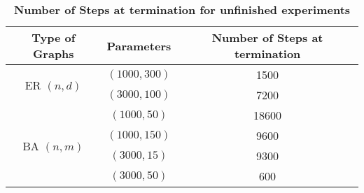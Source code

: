 \begin{table*}[!htpb]
\centering
\small
\caption{\textbf{Number of Steps at termination for unfinished \lwd experiments}}
\label{tab:lwd-steps}

\begin{adjustbox}{width=0.5\textwidth}
\begin{tabular}{|c|c|c|}
\hline
Type of Graphs & Parameters &Number of Steps at termination \\
\hline
\multirow{2}{*}{ER $(n,d)$} 
 & $(1000, 300)$ & 1500 \\
 & $(3000, 100)$ & 7200 \\
\hline
\multirow{4}{*}{BA $(n,m)$} 
 & $(1000, 50)$ & 18600 \\
 & $(1000, 150)$ & 9600 \\
 & $(3000, 15)$ & 9300 \\
 & $(3000, 50)$ & 600 \\
\hline
\end{tabular}
\end{adjustbox}
\end{table*}
